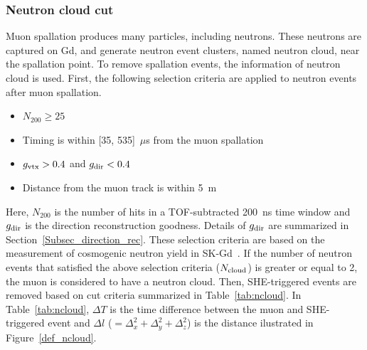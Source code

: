 \subsubsection{Neutron cloud cut}
\vs\hs
Muon spallation produces many particles, including neutrons.
These neutrons are captured on Gd, and generate neutron event clusters, named neutron cloud, near the spallation point.
To remove spallation events, the information of neutron cloud is used.
First, the following selection criteria are applied to neutron events after muon spallation.
\begin{itemize}
	\item $N_{200} \geq 25$
	\item Timing is within [35, 535]~$\mu$s from the muon spallation
	\item $g_{\rm vtx} > 0.4$ and $g_{\rm dir} < 0.4$
	\item Distance from the muon track is within 5~m
\end{itemize}
Here, $N_{200}$ is the number of hits in a TOF-subtracted 200~ns time window and $g_{\rm dir}$ is the direction reconstruction goodness.
Details of $g_{\rm dir}$ are summarized in Section~\ref{Subsec_direction_rec}.
These selection criteria are based on the measurement of cosmogenic neutron yield in SK-Gd~\cite{2023Shinoki}.
If the number of neutron events that satisfied the above selection criteria ($N_{\rm cloud}$) is greater or equal to 2, the muon is considered to have a neutron cloud.
Then, SHE-triggered events are removed based on cut criteria summarized in Table~\ref{tab:ncloud}.
In Table~\ref{tab:ncloud}, $\Delta T$ is the time difference between the muon and SHE-triggered event and $\Delta l$ ($= \Delta_{x}^{2} + \Delta_{y}^{2} + \Delta_{z}^{2}$) is the distance ilustrated in Figure~\ref{def_ncloud}.

